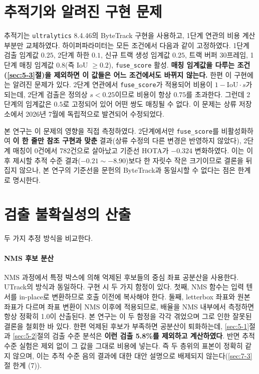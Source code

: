 \documentclass[12pt,a4paper,oneside]{report}
\begin{document}
\section{추적기와 알려진 구현 문제}\label{sec:3-3}

추적기는 \texttt{ultralytics} 8.4.46의 ByteTrack 구현을 사용하고, 1단계 연관의 비용 계산 부분만 교체하였다. 하이퍼파라미터는 모든 조건에서 다음과 같이 고정하였다. 1단계 검출 임계값 $0.25$, 2단계 하한 $0.1$, 신규 트랙 생성 임계값 $0.25$, 트랙 버퍼 30프레임, 1단계 매칭 임계값 $0.8$(즉 IoU $\ge 0.2$), \texttt{fuse\_score} 활성. \textbf{매칭 임계값을 다루는 조건(\ref{sec:5-3}절)을 제외하면 이 값들은 어느 조건에서도 바뀌지 않는다.} 한편 이 구현에는 알려진 문제가 있다. 2단계 연관에서 \texttt{fuse\_score}가 적용되어 비용이 $1 - \mathrm{IoU} \cdot s$가 되는데, 2단계 검출은 정의상 $s < 0.25$이므로 비용이 항상 $0.75$를 초과한다. 그런데 2단계의 임계값은 $0.5$로 고정되어 있어 어떤 쌍도 매칭될 수 없다. 이 문제는 상류 저장소에서 2026년 7월에 독립적으로 발견되어 수정되었다.

본 연구는 이 문제의 영향을 직접 측정하였다. 2단계에서만 \texttt{fuse\_score}를 비활성화하여 \textbf{이 한 줄만 참조 구현과 맞춘} 결과(상류 수정의 다른 변경은 반영하지 않았다), 2단계 매칭이 0건에서 782건으로 살아났고 기준선 HOTA가 $-0.324$ 변화하였다. 이는 이후 제시할 추적 수준 결과($-0.21 \sim -8.90$)보다 한 자릿수 작은 크기이므로 결론을 뒤집지 않으나, 본 연구의 기준선을 문헌의 ByteTrack과 동일시할 수 없다는 점은 한계로 명시한다.

\section{검출 불확실성의 산출}\label{sec:3-4}

두 가지 추정 방식을 비교한다.

\paragraph{NMS 후보 분산} NMS 과정에서 특정 박스에 의해 억제된 후보들의 중심 좌표 공분산을 사용한다. UTrack의 방식과 동일하다. 구현 시 두 가지 함정이 있다. 첫째, NMS 함수는 입력 텐서를 in-place로 변환하므로 호출 이전에 복사해야 한다. 둘째, letterbox 좌표와 원본 좌표가 다르며 좌표 변환이 NMS 이후에 적용되므로, 배율을 NMS 내부에서 측정하면 항상 정확히 1.0이 산출된다. 본 연구는 이 두 함정을 각각 겪었으며 그로 인한 잘못된 결론을 철회한 바 있다. 한편 억제된 후보가 부족하면 공분산이 퇴화하는데, \ref{sec:5-1}절과 \ref{sec:5-2}절의 검출 수준 분석은 \textbf{이런 검출 5.8\%를 제외하고 계산하였다}. 반면 추적 수준 실험은 제외 없이 그 값을 그대로 비용에 넣는다. 즉 두 층위의 표본이 정확히 같지 않으며, 이는 추적 수준 음의 결과에 대한 대안 설명으로 배제되지 않는다(\ref{sec:7-3}절 한계 (7)).
\end{document}
